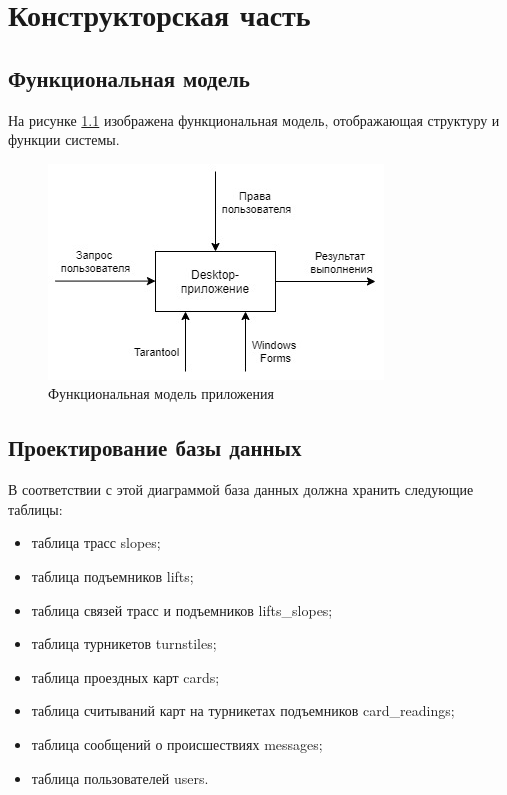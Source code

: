 \chapter{Конструкторская часть}

\section{Функциональная модель}

На рисунке \ref{img:func_model} изображена функциональная модель, отображающая структуру и функции системы.

\begin{figure}[h!]
	\begin{center}
		\includegraphics[scale=0.7]{../imgs/func_model.jpg}
	\end{center}
	\captionsetup{justification=centering}
	\caption{Функциональная модель приложения}
	\label{img:func_model}
\end{figure}









\section{Проектирование базы данных}




В соответствии с этой диаграммой база данных должна хранить следующие таблицы:  


\begin{itemize}
	\item таблица трасс slopes;
	\item таблица подъемников lifts;
	\item таблица связей трасс и подъемников lifts\_slopes;
	\item таблица турникетов turnstiles;
	\item таблица проездных карт cards;
	\item таблица считываний карт на турникетах подъемников card\_readings;
	\item таблица сообщений о происшествиях messages;
	\item таблица пользователей users.
\end{itemize}


